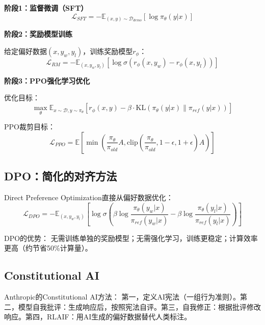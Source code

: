 \textbf{阶段1：监督微调（SFT）}
\begin{equation}
\mathcal{L}_{SFT} = -\mathbb{E}_{(x,y) \sim \mathcal{D}_{demo}} \left[ \log \pi_\theta(y|x) \right]
\end{equation}

\textbf{阶段2：奖励模型训练}

给定偏好数据$(x, y_w, y_l)$，训练奖励模型$r_\phi$：
\begin{equation}
\mathcal{L}_{RM} = -\mathbb{E}_{(x, y_w, y_l)} \left[ \log \sigma(r_\phi(x, y_w) - r_\phi(x, y_l)) \right]
\end{equation}

\textbf{阶段3：PPO强化学习优化}

优化目标：
\begin{equation}
\max_\theta \mathbb{E}_{x \sim \mathcal{D}, y \sim \pi_\theta} \left[ r_\phi(x, y) - \beta \cdot \text{KL}(\pi_\theta(y|x) \| \pi_{ref}(y|x)) \right]
\end{equation}

PPO裁剪目标：
\begin{equation}
\mathcal{L}_{PPO} = \mathbb{E} \left[ \min\left( \frac{\pi_\theta}{\pi_{old}} A, \text{clip}\left(\frac{\pi_\theta}{\pi_{old}}, 1-\epsilon, 1+\epsilon\right) A \right) \right]
\end{equation}

\subsection{DPO：简化的对齐方法}

Direct Preference Optimization直接从偏好数据优化\cite{rafailov2024direct}：
\begin{equation}
\mathcal{L}_{DPO} = -\mathbb{E}_{(x, y_w, y_l)} \left[ \log \sigma \left( \beta \log \frac{\pi_\theta(y_w|x)}{\pi_{ref}(y_w|x)} - \beta \log \frac{\pi_\theta(y_l|x)}{\pi_{ref}(y_l|x)} \right) \right]
\end{equation}

DPO的优势：
无需训练单独的奖励模型；无需强化学习，训练更稳定；计算效率更高（约节省50\%计算量）。

\subsection{Constitutional AI}

Anthropic的Constitutional AI方法\cite{bai2022constitutional}：
第一，定义AI宪法（一组行为准则）。第二，模型自我批评：生成响应后，按照宪法自评。第三，自我修正：根据批评修改响应。第四，RLAIF：用AI生成的偏好数据替代人类标注。


